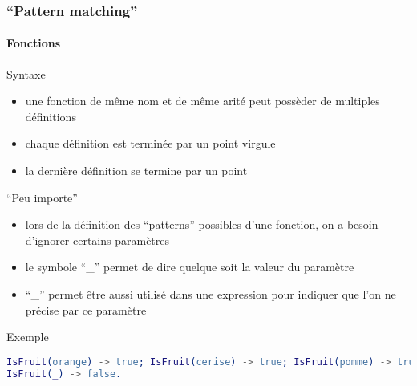 \begin{frame}[fragile]
  \frametitle{``Pattern matching''}
  \framesubtitle{Fonctions}

  \begin{block}{Syntaxe}
    \begin{itemize}
    \item une fonction de même nom et de même arité peut possèder de multiples
      définitions
    \item chaque définition est terminée par un point virgule
    \item la dernière définition se termine par un point
    \end{itemize}
  \end{block}

  \begin{alertblock}{``Peu importe''}
    \begin{itemize}
    \item lors de la définition des ``patterns'' possibles d'une fonction,
      on a besoin d'ignorer certains paramètres
    \item le symbole ``\_'' permet de dire quelque soit la valeur du paramètre
    \item ``\_'' permet être aussi utilisé dans une expression pour
      indiquer que l'on ne précise par ce paramètre
    \end{itemize}
  \end{alertblock}

  \begin{exampleblock}{Exemple}
    \begin{lstlisting}[language=erlang]
IsFruit(orange) -> true; IsFruit(cerise) -> true; IsFruit(pomme) -> true;
IsFruit(_) -> false.
    \end{lstlisting}
  \end{exampleblock}

\end{frame}



